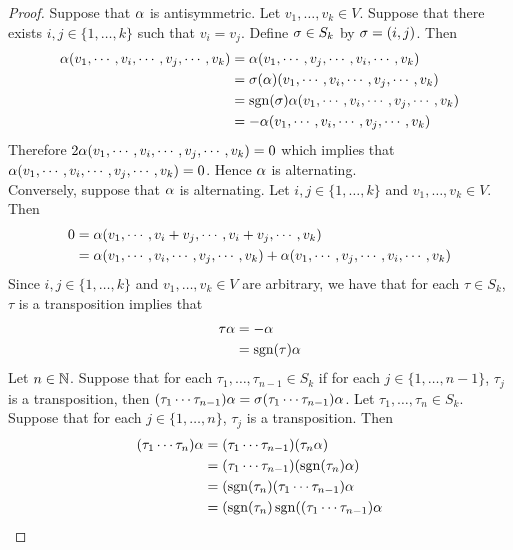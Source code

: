 \documentclass{book}
\begin{document}
	\begin{proof}
		Suppose that $\alpha$ is antisymmetric. Let $v_1, \ldots, v_k \in V$. Suppose that there exists $i,j \in \{1, \ldots, k\}$ such that $v_i = v_j$. Define $\sigma \in S_k$ by $\sigma = (i,j)$. Then 
		\begin{align*}
			\alpha (v_1, \cdots, v_i, \cdots, v_j, \cdots,  v_k)  
			& = \alpha (v_1, \cdots, v_j, \cdots, v_i, \cdots,  v_k)  \\
			& = \sigma(\alpha) (v_1, \cdots, v_i, \cdots, v_j, \cdots,  v_k) \\
			& = \operatorname{sgn}(\sigma)\alpha (v_1, \cdots, v_i, \cdots, v_j, \cdots,  v_k) \\
			& = -\alpha (v_1, \cdots, v_i, \cdots, v_j, \cdots,  v_k) 
		\end{align*} 
		Therefore $2 \alpha (v_1, \cdots, v_i, \cdots, v_j, \cdots,  v_k) = 0$ which implies that $\alpha (v_1, \cdots, v_i, \cdots, v_j, \cdots,  v_k) = 0$. Hence $\alpha$ is alternating. \\
		Conversely, suppose that $\alpha$ is alternating. Let $i,j \in \{1, \ldots, k\}$ and $v_1, \ldots, v_k \in V$. Then 
		\begin{align*}
			0 
			& = \alpha(v_1, \cdots, v_i + v_j, \cdots, v_i + v_j, \cdots,  v_k) \\
			& = \alpha(v_1, \cdots, v_i, \cdots, v_j, \cdots,  v_k) + \alpha(v_1, \cdots, v_j, \cdots, v_i, \cdots,  v_k)
		\end{align*}
		Since $i,j \in \{1, \ldots, k\}$ and $v_1, \ldots, v_k \in V$ are arbitrary, we have that for each $\tau \in S_k$, $\tau$ is a transposition implies that
		\begin{align*}
			\tau \alpha
			& = - \alpha \\
			& = \operatorname{sgn}(\tau) \alpha
		\end{align*}
		Let $n \in \mathbb{N}$. Suppose that for each $\tau_1, \ldots, \tau_{n-1} \in S_k$ if for each $j \in \{1, \ldots, n-1\}$, $\tau_j$ is a transposition, then $(\tau_1 \cdots \tau_{n-1}) \alpha = \sigma(\tau_1 \cdots \tau_{n-1}) \alpha$. Let $\tau_1, \ldots, \tau_n \in S_k$. Suppose that for each $j \in \{1, \ldots, n\}$, $\tau_j$ is a transposition.
		Then 
		\begin{align*}
			(\tau_1 \cdots \tau_n) \al 
			& = (\tau_1 \cdots \tau_{n-1}) (\tau_n \al) \\
			& = (\tau_1 \cdots \tau_{n-1}) (\sgn(\tau_n ) \al) \\
			& = (\sgn(\tau_n ) (\tau_1 \cdots \tau_{n-1}) \al \\
			& = (\sgn(\tau_n ) \sgn((\tau_1 \cdots \tau_{n-1}) \al \\

\end{align*}
\end{proof}
\end{document}
